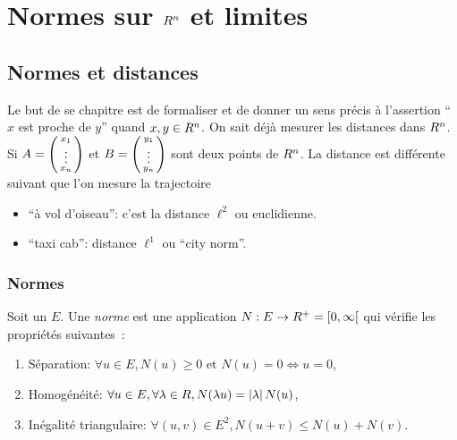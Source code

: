\chapter[Normes]{Normes sur $R^n$ et limites}
%

\sld{\vfill\pagebreak[5]}%

\section{Normes et distances}
Le but de se chapitre est de formaliser et de donner un sens précis à l'assertion ``$x$ est proche de $y$'' quand $x,y\in R^n$. On sait déjà mesurer les distances dans $R^n$. Si $A=\begin{psmallmatrix}
    x_1\\\vdots\\x_n
\end{psmallmatrix}$ et $B=\begin{psmallmatrix}
    y_1\\\vdots\\y_n
\end{psmallmatrix}$
sont deux points de $R^n$. La distance est différente suivant que l'on mesure la trajectoire
\begin{itemize}
    \item ``à vol d'oiseau'': c'est la distance $\ell^2$ ou euclidienne.
    \item ``taxi cab'': distance $\ell^1$ ou ``city norm''.
\end{itemize}

\sld{\vfill\pagebreak[5]}%

\subsection{Normes}


\begin{definition}
    Soit un \rev{} $E$. Une \emph{norme} est une application $N: E \to R^+ = [0,\infty[$ qui vérifie les propriétés suivantes~:
            \begin{enumerate}
                \item Séparation: $\forall u \in E, N(u) \geq 0 \text{ et } N(u) = 0 \Leftrightarrow u=0$,
                \item 	Homogénéité: $\forall u \in E, \forall \lambda \in R, N(\lambda u) = \left\lvert\lambda\right\rvert N(u)$,
                \item  Inégalité triangulaire: $\forall (u,v) \in E^2, N(u+v) \leq N(u) + N(v)$.
            \end{enumerate}
        \end{definition}

